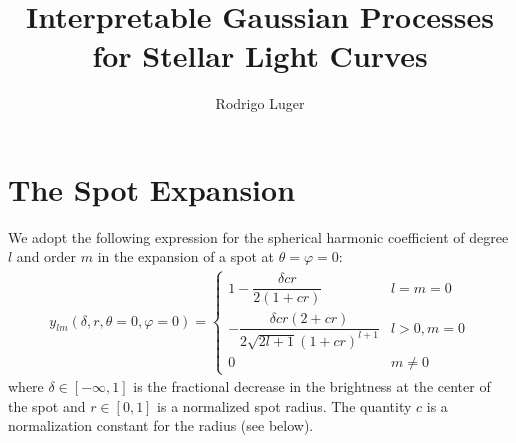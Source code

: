\documentclass[modern]{aastex62}
\begin{document}
\title{%
    \textbf{
        Interpretable Gaussian Processes for Stellar Light Curves
    }
}

\author[0000-0002-0296-3826]{Rodrigo Luger}
%



%
\section{The Spot Expansion}
\label{sec:spot}
%
We adopt the following expression for the spherical harmonic coefficient
of degree $l$ and order $m$ in the expansion of a spot at
$\theta = \varphi = 0$:
%
\begin{align}
    \label{eq:ylm0}
    y_{lm}(\delta, r, \theta = 0, \varphi = 0) =
    \begin{cases}
        1 - \dfrac{\delta c r}{2 (1 + c r)}
         & l = m = 0    \\[2em]
        -\dfrac{\delta c r \left( 2 + c r \right)}
        {2 \sqrt{2l + 1} (1 + c r)^{l + 1}}
         & l > 0, m = 0 \\[2em]
        0
         & m \ne 0
    \end{cases}
\end{align}
%
where $\delta \in [-\infty, 1]$ is the fractional decrease in the brightness
at the center of the spot and $r \in [0, 1]$ is a normalized spot radius.
The quantity $c$ is a normalization constant for the radius (see below).
\end{document}
